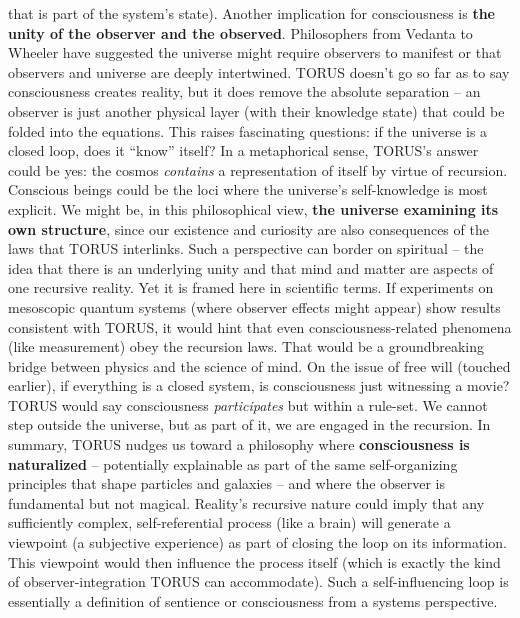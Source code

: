 \documentclass[
]{article}
\begin{document}
\begin{itemize}
  that is part of the system's state). Another implication for
  consciousness is \textbf{the unity of the observer and the observed}.
  Philosophers from Vedanta to Wheeler have suggested the universe might
  require observers to manifest or that observers and universe are
  deeply intertwined. TORUS doesn't go so far as to say consciousness
  creates reality, but it does remove the absolute separation -- an
  observer is just another physical layer (with their knowledge state)
  that could be folded into the equations. This raises fascinating
  questions: if the universe is a closed loop, does it ``know'' itself?
  In a metaphorical sense, TORUS's answer could be yes: the cosmos
  \emph{contains} a representation of itself by virtue of recursion.
  Conscious beings could be the loci where the universe's self-knowledge
  is most explicit. We might be, in this philosophical view, \textbf{the
  universe examining its own structure}, since our existence and
  curiosity are also consequences of the laws that TORUS interlinks.
  Such a perspective can border on spiritual -- the idea that there is
  an underlying unity and that mind and matter are aspects of one
  recursive reality. Yet it is framed here in scientific terms. If
  experiments on mesoscopic quantum systems (where observer effects
  might appear)\hspace{0pt} show results consistent with TORUS, it would
  hint that even consciousness-related phenomena (like measurement) obey
  the recursion laws. That would be a groundbreaking bridge between
  physics and the science of mind. On the issue of free will (touched
  earlier), if everything is a closed system, is consciousness just
  witnessing a movie? TORUS would say consciousness \emph{participates}
  but within a rule-set. We cannot step outside the universe, but as
  part of it, we are engaged in the recursion. In summary, TORUS nudges
  us toward a philosophy where \textbf{consciousness is naturalized} --
  potentially explainable as part of the same self-organizing principles
  that shape particles and galaxies -- and where the observer is
  fundamental but not magical. Reality's recursive nature could imply
  that any sufficiently complex, self-referential process (like a brain)
  will generate a viewpoint (a subjective experience) as part of closing
  the loop on its information. This viewpoint would then influence the
  process itself (which is exactly the kind of observer-integration
  TORUS can accommodate). Such a self-influencing loop is essentially a
  definition of sentience or consciousness from a systems perspective.

\end{itemize}
\end{document}
